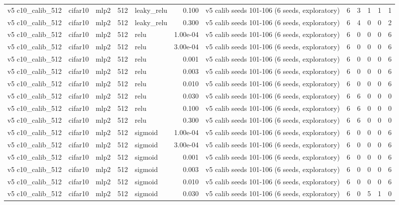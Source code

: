\begin{table}[htbp]
{\begin{tabular}{@{}lllrlrlrrrrr@{}}
v5 c10\_calib\_512 & cifar10 & mlp2 & 512 & leaky\_relu & 0.100 & v5 calib seeds 101-106 (6 seeds, exploratory) & 6 & 3 & 1 & 1 & 1 \\
v5 c10\_calib\_512 & cifar10 & mlp2 & 512 & leaky\_relu & 0.300 & v5 calib seeds 101-106 (6 seeds, exploratory) & 6 & 4 & 0 & 0 & 2 \\
v5 c10\_calib\_512 & cifar10 & mlp2 & 512 & relu & 1.00e-04 & v5 calib seeds 101-106 (6 seeds, exploratory) & 6 & 0 & 0 & 0 & 6 \\
v5 c10\_calib\_512 & cifar10 & mlp2 & 512 & relu & 3.00e-04 & v5 calib seeds 101-106 (6 seeds, exploratory) & 6 & 0 & 0 & 0 & 6 \\
v5 c10\_calib\_512 & cifar10 & mlp2 & 512 & relu & 0.001 & v5 calib seeds 101-106 (6 seeds, exploratory) & 6 & 0 & 0 & 0 & 6 \\
v5 c10\_calib\_512 & cifar10 & mlp2 & 512 & relu & 0.003 & v5 calib seeds 101-106 (6 seeds, exploratory) & 6 & 0 & 0 & 0 & 6 \\
v5 c10\_calib\_512 & cifar10 & mlp2 & 512 & relu & 0.010 & v5 calib seeds 101-106 (6 seeds, exploratory) & 6 & 0 & 0 & 0 & 6 \\
v5 c10\_calib\_512 & cifar10 & mlp2 & 512 & relu & 0.030 & v5 calib seeds 101-106 (6 seeds, exploratory) & 6 & 6 & 0 & 0 & 0 \\
v5 c10\_calib\_512 & cifar10 & mlp2 & 512 & relu & 0.100 & v5 calib seeds 101-106 (6 seeds, exploratory) & 6 & 6 & 0 & 0 & 0 \\
v5 c10\_calib\_512 & cifar10 & mlp2 & 512 & relu & 0.300 & v5 calib seeds 101-106 (6 seeds, exploratory) & 6 & 6 & 0 & 0 & 0 \\
v5 c10\_calib\_512 & cifar10 & mlp2 & 512 & sigmoid & 1.00e-04 & v5 calib seeds 101-106 (6 seeds, exploratory) & 6 & 0 & 0 & 0 & 6 \\
v5 c10\_calib\_512 & cifar10 & mlp2 & 512 & sigmoid & 3.00e-04 & v5 calib seeds 101-106 (6 seeds, exploratory) & 6 & 0 & 0 & 0 & 6 \\
v5 c10\_calib\_512 & cifar10 & mlp2 & 512 & sigmoid & 0.001 & v5 calib seeds 101-106 (6 seeds, exploratory) & 6 & 0 & 0 & 0 & 6 \\
v5 c10\_calib\_512 & cifar10 & mlp2 & 512 & sigmoid & 0.003 & v5 calib seeds 101-106 (6 seeds, exploratory) & 6 & 0 & 0 & 0 & 6 \\
v5 c10\_calib\_512 & cifar10 & mlp2 & 512 & sigmoid & 0.010 & v5 calib seeds 101-106 (6 seeds, exploratory) & 6 & 0 & 0 & 0 & 6 \\
v5 c10\_calib\_512 & cifar10 & mlp2 & 512 & sigmoid & 0.030 & v5 calib seeds 101-106 (6 seeds, exploratory) & 6 & 0 & 5 & 1 & 0 \\

\end{tabular}}
\end{table}
